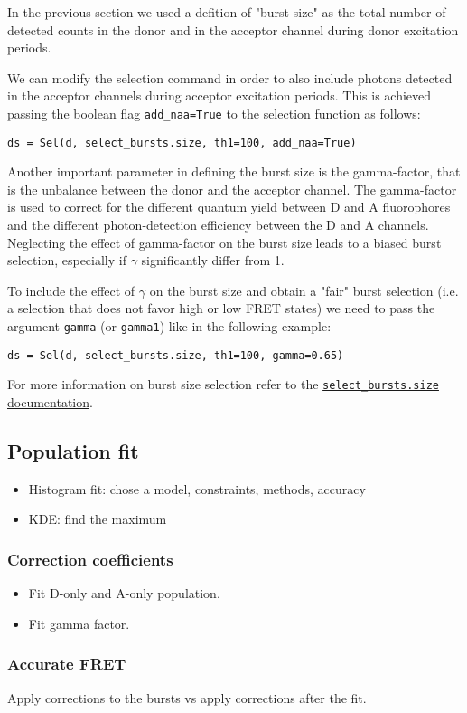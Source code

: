 In the previous section we used a defition of "burst size" as the total number of detected counts in the donor and in the acceptor channel during donor excitation periods. 

We can modify the selection command in order to also include photons detected in the acceptor channels during acceptor excitation periods. This is achieved passing the boolean flag \verb|add_naa=True| to the selection function as follows:

\begin{verbatim}
ds = Sel(d, select_bursts.size, th1=100, add_naa=True)
\end{verbatim}

Another important parameter in defining the burst size is the gamma-factor, that is the unbalance between the donor and the acceptor channel. The gamma-factor is used to correct for the different quantum yield between D and A fluorophores and the different photon-detection efficiency between the D and A channels. Neglecting the effect of gamma-factor on the burst size leads to a biased burst selection, especially if $\gamma$ significantly differ from 1. 

To include the effect of $\gamma$ on the burst size and obtain a "fair" burst selection (i.e. a selection that does not favor high or low FRET states) we
need to pass the argument \verb|gamma| (or \verb|gamma1|) like in the following example:

\begin{verbatim}
ds = Sel(d, select_bursts.size, th1=100, gamma=0.65)
\end{verbatim}

For more information on burst size selection refer to the \href{http://fretbursts.readthedocs.org/en/latest/burst_selection.html#fretbursts.select_bursts.size}{\verb|select_bursts.size| documentation}.

\subsection{Population fit}

\begin{itemize}
\item Histogram fit: chose a model, constraints, methods, accuracy
\item KDE: find the maximum
\end{itemize}

\subsubsection{Correction coefficients}

\begin{itemize}
\item Fit D-only and A-only population.
\item Fit gamma factor.
\end{itemize}


\subsubsection{Accurate FRET}

Apply corrections to the bursts vs apply corrections after the fit.


